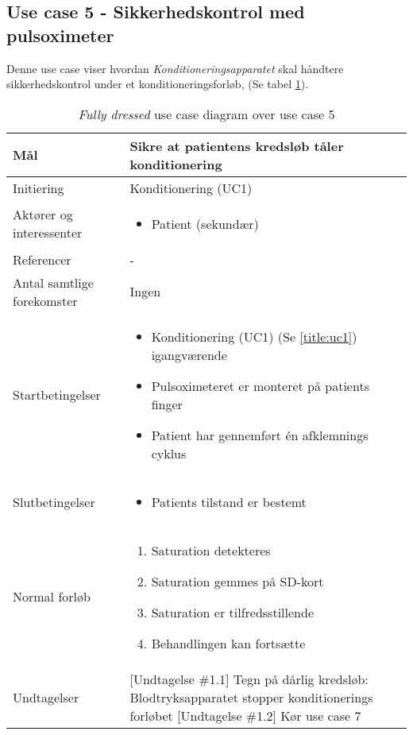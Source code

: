 	\subsection{Use case 5 - Sikkerhedskontrol med pulsoximeter}
	Denne use case viser hvordan \textit{Konditioneringsapparatet} skal håndtere sikkerhedskontrol under et konditioneringsforløb, (Se tabel \ref{tab:uc5}).
	\begin{table}[H]
		\begin{center}
			\begin{tabular}{ | p{} | p{}| } 
				\hline
				Mål & Sikre at patientens kredsløb tåler konditionering \\ 
				\hline
				Initiering &  Konditionering (UC1)\\
				\hline
				Aktører og interessenter & 
				\begin{itemize}
					\item Patient (sekundær)
				\end{itemize} \\ 
				\hline
				Referencer & - \\ 
				\hline
				Antal samtlige forekomster & Ingen \\ 
				\hline	
				Startbetingelser & 
				\begin{itemize}
					\item Konditionering (UC1) (Se \ref{title:uc1}) igangværende
					\item Pulsoximeteret er monteret på patients finger
					\item Patient har gennemført én afklemnings cyklus
 				\end{itemize} \\ 
				\hline
				Slutbetingelser & 
				\begin{itemize}
					\item Patients tilstand er bestemt 
				\end{itemize} \\ 
				\hline
				Normal forløb & \begin{enumerate}
					\setlength\itemsep{0cm} %
					\item Saturation detekteres
					\item Saturation gemmes på SD-kort
					\item Saturation er tilfredsstillende
					\subitem [Undtagelse \#1.1][Undtagelse \#1.2]
					\item Behandlingen kan fortsætte
				\end{enumerate} \\ 
				\hline
				Undtagelser &  [Undtagelse \#1.1] Tegn på dårlig kredsløb: Blodtryksapparatet stopper konditionerings forløbet 
				[Undtagelse \#1.2] Kør use case 7\\ 
				\hline
			\end{tabular}
		\end{center}
		\caption{\textit{Fully dressed} use case diagram over use case 5} \label{tab:uc5}
	\end{table}
			\newpage
